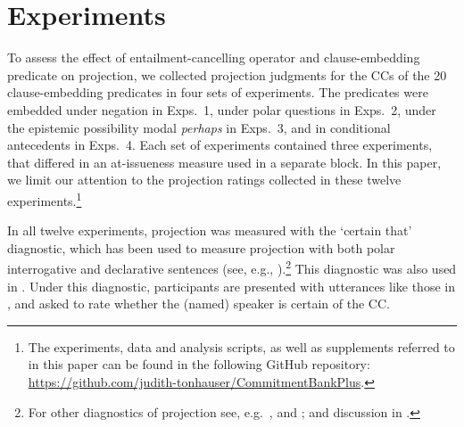 \documentclass[a4paper,12pt,twoside]{article}
\begin{document}
  

  


\section{Experiments}\label{s2}

	To assess the effect of entailment-cancelling operator and clause-embedding predicate on projection, we collected projection judgments for the CCs of the 20 clause-embedding predicates in four sets of experiments.
    The predicates were embedded under negation in Exps.~1, under polar questions in Exps.~2, under the epistemic possibility modal {\em perhaps} in Exps.~3, and in conditional antecedents in Exps.~4. Each set of experiments contained three experiments, that differed in an at-issueness measure used in a separate block. In this paper, we limit our attention to the projection ratings collected in these twelve experiments.\footnote{\label{footnote-supplement}The experiments, data and analysis scripts, as well as supplements referred to in this paper can be found in the following GitHub repository: \url{https://github.com/judith-tonhauser/CommitmentBankPlus}.}

	In all twelve experiments, projection was measured with the `certain that' diagnostic, which has been used to measure projection with both polar interrogative and declarative sentences (see, e.g., \citealt{tonhauser_prosodic_2016,djarv_prosodic_2017,stevens_rational_2017,lorson_influence_2018,tonhauser_how_2018,mahler_does_2019,mahler_social_2020,de_marneffe_commitmentbank_2019}).\footnote{For other diagnostics of projection see, e.g.\ \citealt{smith_projection_2011,xue_correlation_2011}, and \citealt{tonhauser_toward_2013}; and discussion in \citealt{tonhauser_how_2018}.} This diagnostic was also used in \citealt{sieker_projective_2022}. Under this diagnostic, participants are presented with utterances like those in \Next, and asked to rate whether the (named) speaker is certain of the CC. 
\end{document}

